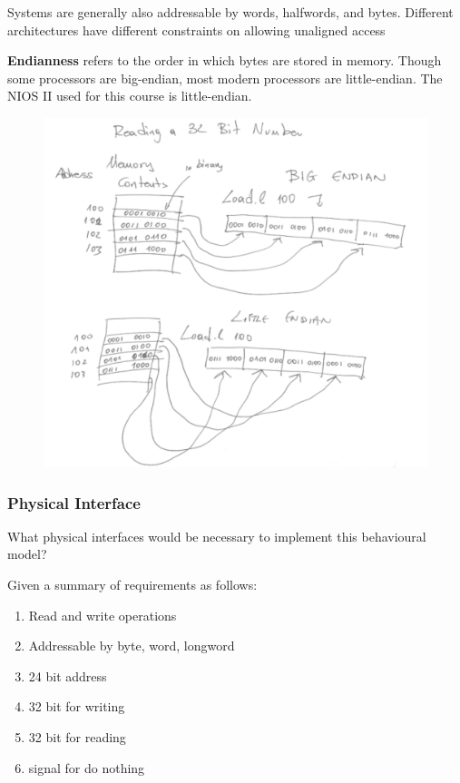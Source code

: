 \documentclass[10pt]{article}
\begin{document}
Systems are generally also addressable by words, halfwords, and bytes.
Different architectures have different constraints on allowing unaligned access

\textbf{Endianness} refers to the order in which bytes are stored in memory. Though some processors are big-endian, most modern processors are little-endian. The NIOS II used for this course is little-endian. 

\begin{figure}[H]
	\centering
	\includegraphics[width=0.8\linewidth]{img/image_2022-09-16-02-16-30.png}
\end{figure}

\subsubsection{Physical Interface}

What physical interfaces would be necessary to implement this behavioural model? 

Given a summary of requirements as follows:

\begin{enumerate}
	\item Read and write operations
	\item Addressable by byte, word, longword
	\item 24 bit address
	\item 32 bit for writing
	\item 32 bit for reading
	\item signal for do nothing
\end{enumerate}
\end{document}
